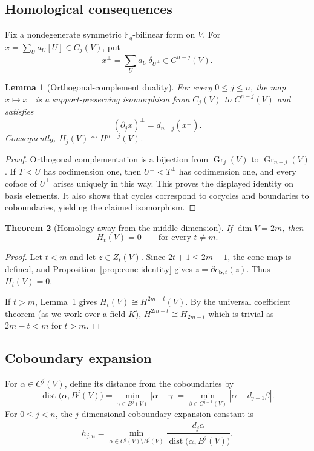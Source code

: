 \documentclass[11pt]{article}
\numberwithin{equation}{section}
\newtheorem{theorem}{Theorem}[section]
\newtheorem{lemma}[theorem]{Lemma}
\newcommand{\F}{\mathbb F}
\newcommand{\Gr}{\operatorname{Gr}}
\begin{document}
\subsection{Homological consequences}

Fix a nondegenerate symmetric $\F_q$-bilinear form on $V$. For
$x=\sum_Ua_U[U]\in C_j(V)$, put 
\[
 x^\perp
 =
 \sum_Ua_U\,\delta_{U^\perp}
 \in C^{n-j}(V).
\]

\begin{lemma}[Orthogonal-complement duality]
\label{lem:orthogonal-complement-duality}
For every $0\le j\le n$, the map $x\mapsto x^\perp$ is a
support-preserving isomorphism from $C_j(V)$ to $C^{n-j}(V)$ and
satisfies
\[
 (\partial_jx)^\perp=d_{n-j}(x^\perp).
\]
Consequently,
$H_j(V)\cong H^{n-j}(V)$.
\end{lemma}

\begin{proof}
Orthogonal complementation is a bijection from $\Gr_j(V)$ to
$\Gr_{n-j}(V)$. If $T<U$ has codimension one, then
$U^\perp<T^\perp$ has codimension one, and every coface of
$U^\perp$ arises uniquely in this way. This proves the displayed
identity on basis elements. It also shows that cycles correspond to
cocycles and boundaries to coboundaries, yielding the claimed
isomorphism.
\end{proof}

\begin{theorem}[Homology away from the middle dimension]
\label{thm:homology-away-from-middle}
If $\dim V=2m$, then
\[
 H_t(V)=0
 \qquad\text{for every }t\ne m.
\]
\end{theorem}

\begin{proof}
Let $t<m$ and let $z\in Z_t(V)$. Since $2t+1\le2m-1$, the cone map
is defined, and Proposition~\ref{prop:cone-identity} gives
$z=\partial c_{\mathbf b,t}(z)$. Thus $H_t(V)=0$.

If $t>m$, Lemma~\ref{lem:orthogonal-complement-duality} gives
$H_t(V)\cong H^{2m-t}(V)$. By the universal coefficient theorem (as we work over a field $K$), $H^{2m-t}\cong H_{2m-t}$ which is trivial as $2m-t<m$ for $t>m$.
\end{proof}

\subsection{Coboundary expansion}
\label{subsec:coboundary-expansion}

For $\alpha\in C^j(V)$, define its distance from the coboundaries by
\[
 \operatorname{dist}\bigl(\alpha,B^j(V)\bigr)
 =
 \min_{\gamma\in B^j(V)}|\alpha-\gamma|
 =
 \min_{\beta\in C^{j-1}(V)}|\alpha-d_{j-1}\beta|.
\]
For $0\le j<n$, the $j$-dimensional coboundary expansion constant is
\[
 h_{j,n}
 =
 \min_{\alpha\in C^j(V)\setminus B^j(V)}
 \frac{|d_j\alpha|}
 {\operatorname{dist}\bigl(\alpha,B^j(V)\bigr)}.
\]
\end{document}
